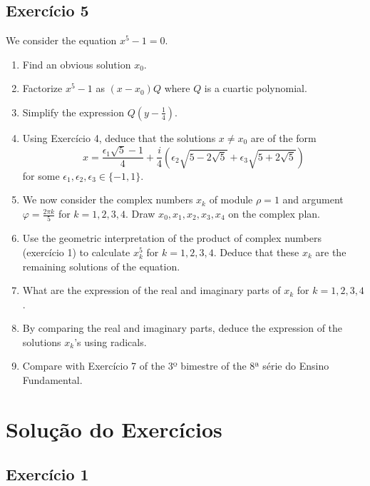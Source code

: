\subsection*{Exercício 5}

We consider the equation $x^5-1=0$.

\begin{enumerate}
\item Find an obvious solution $x_0$.
\item Factorize $x^5-1$ as ${(x-x_0)}Q$ where $Q$ is a cuartic polynomial.
\item Simplify the expression $Q(y-\frac{1}{4})$.
\item Using Exercício 4, deduce that the solutions $x \neq x_0$ are of the form
    $$x=\frac{\epsilon_1\sqrt{5} - 1}{4}+
    \frac{i}{4} \left(\epsilon_2 \sqrt{5-2\sqrt{5}}+
    \epsilon_3 \sqrt{5+2\sqrt{5}} \right)$$
  for some $\epsilon_1,\epsilon_2,\epsilon_3 \in \{ -1, 1 \}$.
\item We now consider the complex numbers $x_k$ of module $\rho = 1$ and
  argument $\varphi = \frac{2 \pi k}{5}$ for $k=1,2,3,4$.
  Draw $x_0,x_1,x_2,x_3,x_4$ on the complex plan.
\item Use the geometric interpretation of the product of complex numbers
  (exercício 1) to calculate $x_k^5$ for
  $k=1,2,3,4$. Deduce that these $x_k$ are the remaining solutions of the
  equation.
\item What are the expression of the real and imaginary parts of $x_k$
  for $k=1,2,3,4$.
\item By comparing the real and imaginary parts, deduce the expression of the
  solutions $x_k$'s using radicals.
\item Compare with Exercício 7 of the 3º bimestre of the
  8ª série do Ensino Fundamental.
\end{enumerate}

\section{Solução do Exercícios}

\subsection*{Exercício 1}

